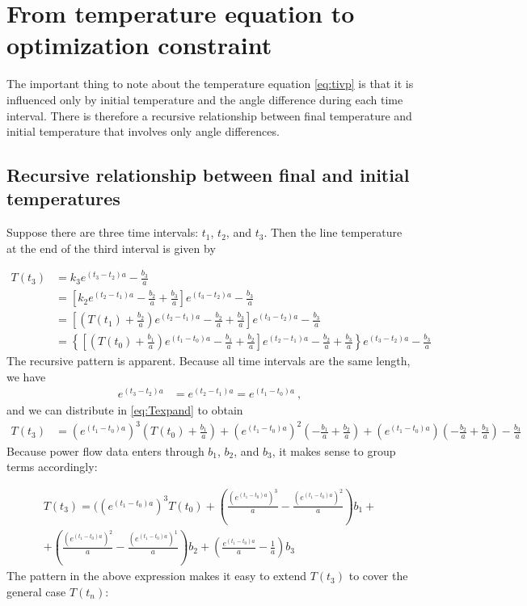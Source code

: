 \documentclass{article}
\begin{document}
\section{From temperature equation to optimization
constraint}\label{from-ivp-to-optimization-constraint}

The important thing to note about the temperature equation \eqref{eq:tivp} is that it is influenced only by initial temperature and the angle difference during each time interval. There is therefore a recursive relationship between final temperature and initial temperature that involves only angle differences.

\subsection{Recursive relationship between final and initial temperatures}
Suppose there are three time intervals: $t_1$, $t_2$, and $t_3$. Then the line temperature at the end of the third interval is given by

\begin{align}
\nonumber T(t_3) &= k_3 e^{(t_3-t_2)a} - \frac{b_3}{a} \\
\nonumber &= \left[k_2 e^{(t_2-t_1)a} - \frac{b_2}{a} + \frac{b_3}{a}\right]e^{(t_3-t_2)a} - \frac{b_3}{a} \\
\nonumber &= \left[\left( T(t_1) + \frac{b_2}{a} \right)e^{(t_2-t_1)a} - \frac{b_2}{a} + \frac{b_3}{a}\right]e^{(t_3-t_2)a} - \frac{b_3}{a} \\
\label{eq:Texpand} &= \left\lbrace\left[\left(T(t_0) + \frac{b_1}{a}\right) e^{(t_1-t_0)a} - \frac{b_1}{a} + \frac{b_2}{a}\right]e^{(t_2-t_1)a} - \frac{b_2}{a} + \frac{b_3}{a}\right\rbrace e^{(t_3-t_2)a} - \frac{b_3}{a}
\end{align}
The recursive pattern is apparent. Because all time intervals are the same length, we have
\begin{align*}
e^{(t_3-t_2)a} &= e^{(t_2-t_1)a} = e^{(t_1-t_0)a}~,
\end{align*}
and we can distribute in \eqref{eq:Texpand} to obtain
\begin{align}
T(t_3) &= (e^{(t_1-t_0)a})^3\left(T(t_0) + \frac{b_1}{a}\right) + (e^{(t_1-t_0)a})^2\left(- \frac{b_1}{a} + \frac{b_2}{a}\right) + (e^{(t_1-t_0)a})\left(- \frac{b_2}{a} + \frac{b_3}{a}\right) - \frac{b_3}{a}
\end{align}
Because power flow data enters through $b_1$, $b_2$, and $b_3$, it makes sense to
group terms accordingly:

\begin{multline}
T(t_3) = ((e^{(t_1-t_0)a})^3T(t_0) + \left(\frac{(e^{(t_1-t_0)a})^3}{a} - \frac{(e^{(t_1-t_0)a})^2}{a}\right)b_1 + \\ + \left( \frac{(e^{(t_1-t_0)a})^2}{a} - \frac{(e^{(t_1-t_0)a})^1}{a}\right)b_2 + \left(\frac{e^{(t_1-t_0)a}}{a} - \frac{1}{a}\right) b_3
\end{multline}
The pattern in the above expression makes it easy to extend $T(t_3)$ to cover the general case $T(t_n)$:
\end{document}
